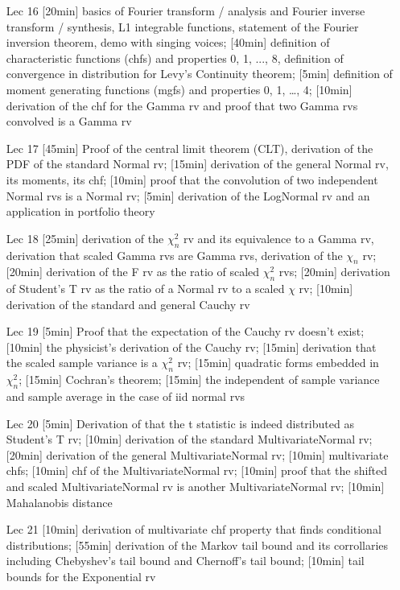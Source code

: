 \begin{enumerate}
\item[Lec 16] [20min] basics of Fourier transform / analysis and Fourier inverse transform / synthesis, L1 integrable functions, statement of the Fourier inversion theorem, demo with singing voices; [40min] definition of characteristic functions (chfs) and properties 0, 1, ..., 8, definition of convergence in distribution for Levy's Continuity theorem; [5min] definition of moment generating functions (mgfs) and properties 0, 1, \ldots, 4; [10min] derivation of the chf for the Gamma rv and proof that two Gamma rvs convolved is a Gamma rv

\item[Lec 17] [45min] Proof of the central limit theorem (CLT), derivation of the PDF of the standard Normal rv; [15min] derivation of the general Normal rv, its moments, its chf; [10min] proof that the convolution of two independent Normal rvs is a Normal rv; [5min] derivation of the LogNormal rv and an application in portfolio theory

\item[Lec 18] [25min] derivation of the $\chi^2_n$ rv and its equivalence to a Gamma rv, derivation that scaled Gamma rvs are Gamma rvs, derivation of the $\chi_n$ rv; [20min] derivation of the F rv as the ratio of scaled $\chi^2_n$ rvs; [20min] derivation of Student's T rv as the ratio of a Normal rv to a scaled $\chi$ rv; [10min] derivation of the standard and general Cauchy rv

\item[Lec 19] [5min] Proof that the expectation of the Cauchy rv doesn't exist; [10min] the physicist's derivation of the Cauchy rv; [15min] derivation that the scaled sample variance is a $\chi^2_n$ rv; [15min] quadratic forms embedded in $\chi^2_n$; [15min] Cochran's theorem; [15min] the independent of sample variance and sample average in the case of iid normal rvs

\item[Lec 20] [5min] Derivation of that the t statistic is indeed distributed as Student's T rv; [10min] derivation of the standard MultivariateNormal rv; [20min] derivation of the general MultivariateNormal rv; [10min] multivariate chfs; [10min] chf of the MultivariateNormal rv; [10min] proof that the shifted and scaled MultivariateNormal rv is another MultivariateNormal rv; [10min] Mahalanobis distance

\item[Lec 21] [10min] derivation of multivariate chf property that finds conditional distributions; [55min] derivation of the Markov tail bound and its corrollaries including Chebyshev's tail bound and Chernoff's tail bound; [10min] tail bounds for the Exponential rv


\end{enumerate}

